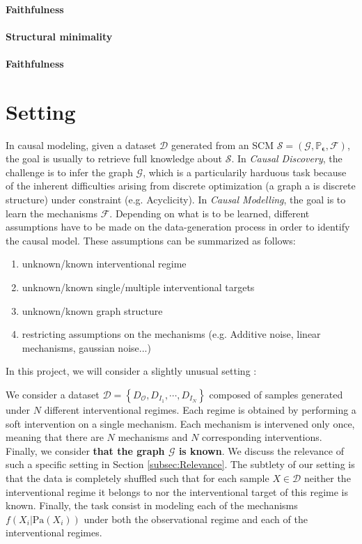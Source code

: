 \documentclass{article}
\begin{document}
\paragraph{Faithfulness}

\paragraph{Structural minimality}

\paragraph{Faithfulness}

\section{Setting}\label{subsec:setting}

In causal modeling, given a dataset $\mathcal{D}$ generated from an SCM $\mathcal{S}= (\mathcal{G}, \mathbb{P}_{\boldsymbol{\epsilon}}, \mathcal{F})$, the goal is usually to retrieve full knowledge about $\mathcal{S}$. In \textit{Causal Discovery}, the challenge is to infer the graph $\mathcal{G}$, which is a particularily harduous task because of the inherent difficulties arising from discrete optimization (a graph a is discrete structure) under constraint (e.g. Acyclicity). In \textit{Causal Modelling}, the goal is to learn the mechanisms $\mathcal{F}$. Depending on what is to be learned, different assumptions have to be made on the data-generation process in order to identify the causal model. These assumptions can be summarized as follows:
\begin{enumerate}
    \item unknown/known interventional regime
    \item unknown/known single/multiple interventional targets
    \item unknown/known graph structure
    \item restricting assumptions on the mechanisms (e.g. Additive noise, linear mechanisms, gaussian noise...)
\end{enumerate}

In this project, we will consider a slightly unusual setting :

We consider a dataset $\mathcal{D} = \left\{ D_{\mathcal{O}},D_{I_1}, \cdots, D_{I_N} \right\}$ composed of samples generated under $N$ different interventional regimes. Each regime is obtained by performing a soft intervention on a single mechanism. Each mechanism is intervened only once, meaning that there are $N$ mechanisms and $N$ corresponding interventions. Finally, we consider \textbf{that the graph $\mathcal{G}$ is known}. We discuss the relevance of such a specific setting in Section \ref{subsec:Relevance}.
 The subtlety of our setting is that the data is completely shuffled such that for each sample $X \in \mathcal{D}$ neither the interventional regime it belongs to nor the interventional target of this regime is known. Finally, the task consist in modeling each of the mechanisms $f(X_i | \text{Pa}(X_i))$ under both the observational regime and each of the interventional regimes.
\end{document}
